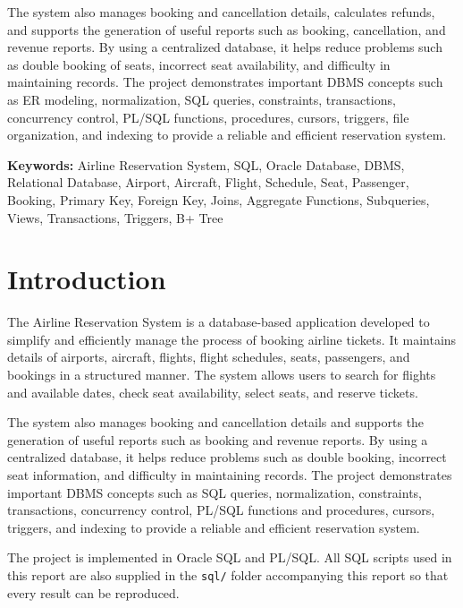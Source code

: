 \documentclass[12pt,a4paper]{article}
\begin{document}
The system also manages booking and cancellation details, calculates refunds, and supports the generation
of useful reports such as booking, cancellation, and revenue reports. By using a centralized database, it
helps reduce problems such as double booking of seats, incorrect seat availability, and difficulty in
maintaining records. The project demonstrates important DBMS concepts such as ER modeling, normalization,
SQL queries, constraints, transactions, concurrency control, PL/SQL functions, procedures, cursors,
triggers, file organization, and indexing to provide a reliable and efficient reservation system.

\vspace{0.5em}
\noindent\textbf{Keywords:} Airline Reservation System, SQL, Oracle Database, DBMS, Relational Database,
Airport, Aircraft, Flight, Schedule, Seat, Passenger, Booking, Primary Key, Foreign Key, Joins, Aggregate
Functions, Subqueries, Views, Transactions, Triggers, B+ Tree
\newpage

\section{Introduction}
The Airline Reservation System is a database-based application developed to simplify and efficiently
manage the process of booking airline tickets. It maintains details of airports, aircraft, flights,
flight schedules, seats, passengers, and bookings in a structured manner. The system allows users to
search for flights and available dates, check seat availability, select seats, and reserve tickets.

The system also manages booking and cancellation details and supports the generation of useful reports
such as booking and revenue reports. By using a centralized database, it helps reduce problems such as
double booking, incorrect seat information, and difficulty in maintaining records. The project
demonstrates important DBMS concepts such as SQL queries, normalization, constraints, transactions,
concurrency control, PL/SQL functions and procedures, cursors, triggers, and indexing to provide a
reliable and efficient reservation system.

The project is implemented in Oracle SQL and PL/SQL. All SQL scripts used in this report are also
supplied in the \texttt{sql/} folder accompanying this report so that every result can be reproduced.
\end{document}
